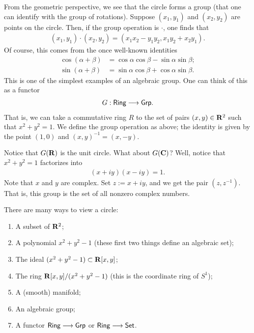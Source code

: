 \documentclass[11pt, oneside,margin=1in]{article}
\begin{document}
From the geometric perspective, we see that the circle forms a group (that one can identify with the group of rotations). Suppose $(x_1,y_1)$ and $(x_2,y_2)$ are points on the circle. Then, if the group operation is $\cdot$, one finds that
\begin{align*}
	(x_1,y_1) \cdot (x_2,y_2) = (x_1x_2-y_1y_2, x_1y_2+x_2y_1).
\end{align*}
Of course, this comes from the once well-known identities
\begin{align*}
	\cos(\alpha+\beta) &=\cos\alpha \cos\beta- \sin \alpha \sin \beta;\\
	\sin(\alpha + \beta) &= \sin\alpha \cos\beta + \cos \alpha \sin \beta.
\end{align*}
This is one of the simplest examples of an algebraic group. One can think of this as a functor
\begin{align*}
	G : \textsf{Ring} \longrightarrow \textsf{Grp}.
\end{align*}
That is, we can take a commutative ring $R$ to the set of pairs $(x,y)\in \mathbf R^2$ such that $x^2+y^2=1$. We define the group operation as above; the identity is given by the point $(1,0)$ and $(x,y) ^{-1} = (x,-y)$.

Notice that $G(\mathbf R)$ is the unit circle. What about $G(\mathbf C)$? Well, notice that $x^2+y^2 =1$ factorizes into
\begin{align*}
	(x+iy) (x-iy) = 1.
\end{align*}
Note that $x$ and $y$ are complex. Set $z := x+iy$, and we get the pair $(z,z^{-1})$. That is, this group is the set of all nonzero complex numbers.

There are many ways to view a circle:
\begin{enumerate}
	\item A subset of $\mathbf R^2$;
	\item A polynomial $x^2 + y^2 -1$ (these first two things define an algebraic set);
	\item The ideal $(x^2+y^2-1)\subset \mathbf R[x,y]$;
	\item The ring $\mathbf R[x,y] / (x^2+y^2-1)$ (this is the coordinate ring of $S^1$);
	\item A (smooth) manifold;
	\item An algebraic group;
	\item A functor $\textsf{Ring}\longrightarrow \textsf{Grp}$ or $\textsf{Ring} \longrightarrow \textsf{Set}$.
\end{enumerate}
\end{document}
